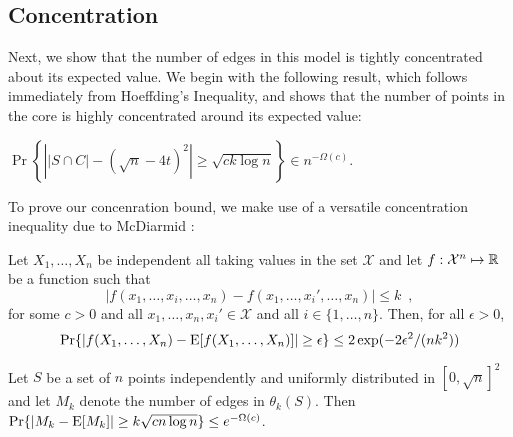 \documentclass{patmorin}
\begin{document}
\subsection{Concentration}

Next, we show that the number of edges in this model is tightly
concentrated about its expected value.  We begin with the following
result, which follows immediately from Hoeffding's Inequality, and shows
that the number of points in the core is highly concentrated around its
expected value:
\begin{lem}
  $\Pr\left\{\left||S\cap C|-(\sqrt{n}-4t)^2\right| \ge \sqrt{ck\log n}\right\}
  \in n^{-\Omega(c)}$.
\end{lem}

To prove our concenration bound, we make use of a versatile concentration
inequality due to McDiarmid \cite{X}:

\begin{thm}
Let $X_1,\ldots,X_n$ be independent all taking values in the set
$\mathcal{X}$ and let $f:\mathcal{X}^n\mapsto\mathbb{R}$ be a function such that
\[
    |f(x_1,\ldots,x_i,\ldots,x_n) - f(x_1,\ldots,x_i',\ldots,x_n)|
    \le k \enspace ,
\]
for some $c>0$ and all $x_1,\ldots,x_n,x_i'\in \mathcal{X}$
and all $i\in\{1,\ldots,n\}$.
Then, for all $\epsilon > 0$,
\[
    \Pr\{|f(X_1,\ldots,X_n) - \mathrm{E}[f(X_1,\ldots,X_n)]| \ge \epsilon\}
       \le 2\exp(-2\epsilon^2/(nk^2))
\]
\end{thm}

\begin{lem}
 Let $S$ be a set of $n$ points independently and uniformly distributed
 in $[0,\sqrt{n}]^2$ and let $M_k$ denote the number of edges in $\theta_k(S)$.
 Then $\Pr\{|M_k-\mathrm{E}[M_k]| \ge k\sqrt{cn\log n}\} \le e^{-\Omega(c)}$.
\end{lem}
\end{document}
